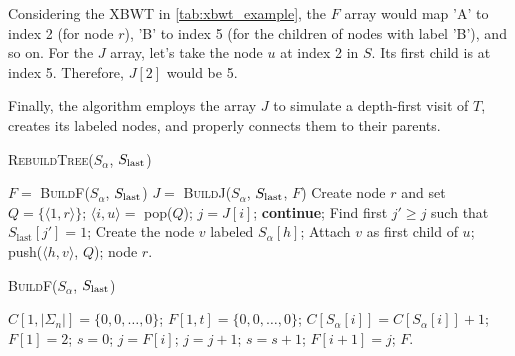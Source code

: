 \begin{example}
    Considering the XBWT in \cref{tab:xbwt_example}, the $F$ array would map 'A' to index 2 (for node $r$), 'B' to index 5 (for the children of nodes with label 'B'), and so on. For the $J$ array, let's take the node $u$ at index 2 in $S$. Its first child is at index 5. Therefore, $J[2]$ would be 5.
\end{example}

Finally, the algorithm employs the array $J$ to
simulate a depth-first visit of $T$, creates its labeled nodes, and properly connects them to their parents. 

\begin{algorithm}[H]
    \caption{\textsc{RebuildTree}($S_\alpha$, $S_\textup{last}$)}
    \label{alg:rebuildTree}
    \begin{algorithmic}[1]
    \State $F = $ \textsc{BuildF}($S_\alpha$, $S_{\textup{last}}$)
    \State $J = $ \textsc{BuildJ}($S_\alpha$, $S_{\textup{last}}$, $F$)
    \State Create node $r$ and set $Q = \{\langle1, r\rangle\}$; 
     
        \State $\langle i, u \rangle = $ pop($Q$);
        \State $j = J[i]$; 
         
            \State \textbf{continue};
        \EndIf
        \State Find first $j' \geq j$ such that $S_{\text{last}}[j'] = 1$; 
            \State Create the node $v$ labeled $S_\alpha[h]$;
            \State Attach $v$ as first child of $u$;
            \State push($\langle h, v \rangle$, $Q$);
        \EndFor
    \EndWhile
    \State \Return node $r$.
    \end{algorithmic}
\end{algorithm}

\begin{algorithm}[H]
    \caption{\textsc{BuildF}($S_\alpha$, $S_{\textup{last}}$)}
    \label{alg:buildF}
    \begin{algorithmic}[1]
    \State $C[1,|\Sigma_n|] = \{0, 0, \dots, 0\}$;
    \State $F[1,t] = \{0, 0, \dots, 0\}$;
        \State $C[S_\alpha[i]] = C[S_\alpha[i]] + 1$; 
    \EndFor
    \State $F[1] = 2$; 
     
        \State $s = 0$; $j = F[i]$;
         
            \State $j = j + 1$;
             
                \State $s = s + 1$;
            \EndIf
        \EndWhile
        \State $F[i+1] = j$;
    \EndFor
    \State \Return $F$.
    \end{algorithmic}
\end{algorithm}
    
